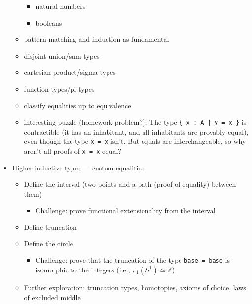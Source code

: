\documentclass{article}
\begin{document}
\begin{itemize}
\begin{itemize}
      \begin{itemize}
        \item natural numbers
        \item booleans
      \end{itemize}
      \item pattern matching and induction as fundamental
      \item disjoint union/sum types
      \item cartesian product/sigma types
      \item function types/pi types
      \item classify equalities up to equivalence
      \item interesting puzzle (homework problem?): The type \texttt{\{ x : A | y = x \}} is contractible (it has an inhabitant, and all inhabitants are provably equal), even though the type \texttt{x = x} isn't.  But equals are interchangeable, so why aren't all proofs of \texttt{x = x} equal?
    \end{itemize}
    \item Higher inductive types --- custom equalities
    \begin{itemize}
      \item Define the interval (two points and a path (proof of equality) between them)
      \begin{itemize}
        \item Challenge: prove functional extensionality from the interval
      \end{itemize}
      \item Define truncation
      \item Define the circle
      \begin{itemize}
        \item Challenge: prove that the truncation of the type \texttt{base = base} is isomorphic to the integers (i.e., $\pi_1(S^1) \simeq \mathbb{Z}$)
      \end{itemize}
      \item Further exploration: truncation types, homotopies, axioms of choice, laws of excluded middle
  \end{itemize}
\end{itemize}
\clearpage
\end{document}

